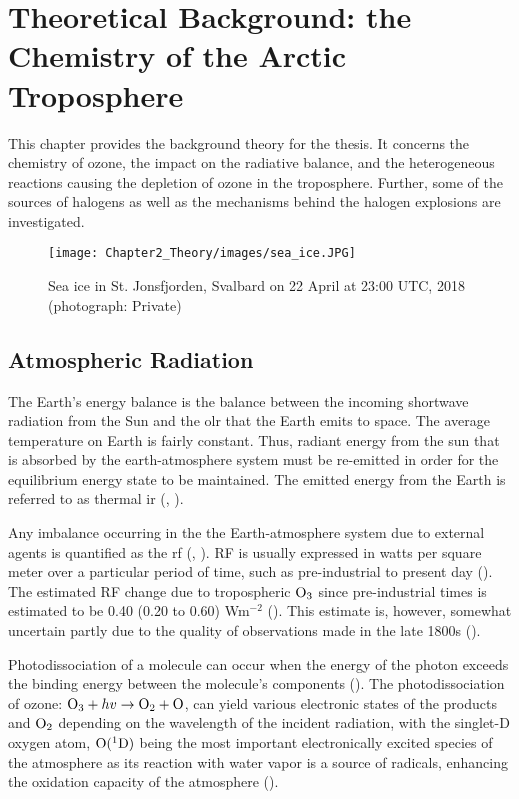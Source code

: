 \setcounter{chapter}{1} 
\chapter{Theoretical Background: the Chemistry of the Arctic Troposphere} \label{ch:theoretical_back}

This chapter provides the background theory for the thesis. It concerns the chemistry of ozone, the impact on the radiative balance, and the heterogeneous reactions causing the depletion of ozone in the troposphere. Further, some of the sources of halogens as well as the mechanisms behind the halogen explosions are investigated. 

\begin{figure}
    \centering
    \texttt{[image: Chapter2\_Theory/images/sea\_ice.JPG]}
    \caption{Sea ice in St. Jonsfjorden, Svalbard on 22 April at 23:00 UTC, 2018 (photograph: Private)}
    \label{fig:sea_ice}
\end{figure}


\section{Atmospheric Radiation}\label{sec:atm_rad}

The Earth's energy balance is the balance between the incoming shortwave radiation from the Sun and the \acrfull{olr} that the Earth emits to space. The average temperature on Earth is fairly constant. Thus, radiant energy from the sun that is absorbed by the earth-atmosphere system must be re-emitted in order for the equilibrium energy state to be maintained. The emitted energy from the Earth is referred to as thermal \acrfull{ir} (\cite{Liou_AtmRad}, \cite{SeinfeldSpyros}). 

\medskip

Any imbalance occurring in the the Earth-atmosphere system due to external agents is quantified as the \acrfull{rf} (\cite{IPCCchapter8}, \cite{Bowman2013}). RF is usually expressed in watts per square meter over a particular period of time, such as pre-industrial to present day (\cite{IPCCchapter8}). The estimated RF change due to tropospheric $\mathrm{O_3}$ since pre-industrial times is estimated to be 0.40 (0.20 to 0.60) Wm$^{-2}$ (\cite{IPCCchapter8}). This estimate is, however, somewhat uncertain partly due to the quality of observations made in the late 1800s (\cite{Tarasick2019}).


\medskip

Photodissociation of a molecule can occur when the energy of the photon exceeds the binding energy between the molecule's components (\cite{SeinfeldSpyros}). The photodissociation of ozone: $\mathrm{O_3} + hv \rightarrow \mathrm{O_2} + \mathrm{O}$, can yield various electronic states of the products  and $\mathrm{O_2}$ depending on the wavelength of the incident radiation, with the singlet-D oxygen atom, $\mathrm{O}(^1\mathrm{D})$ being the most important electronically excited species of the atmosphere as its reaction with water vapor is a source of  radicals, enhancing the oxidation capacity of the atmosphere (\cite{SeinfeldSpyros}).


